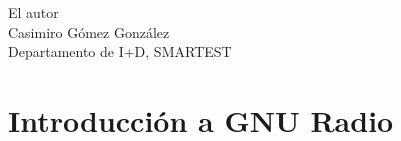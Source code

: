 \documentclass[12pt]{book}
\theoremstyle{definition}
\theoremstyle{remark}
\theoremstyle{plain}
\begin{document}
\begin{flushright}

El autor\\
Casimiro Gómez González\\
Departamento de I+D, SMARTEST
\end{flushright}

\tableofcontents

\mainmatter


\chapter{Introducción a GNU Radio}


\backmatter
\end{document}
